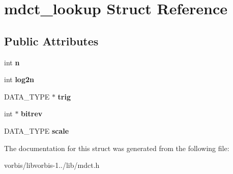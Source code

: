 \hypertarget{structmdct__lookup}{\section{mdct\+\_\+lookup Struct Reference}
\label{structmdct__lookup}
}
\subsection*{Public Attributes}
\begin{DoxyCompactItemize}
\item 
\hypertarget{structmdct__lookup_a593e7827bf9dda70f513223af3169a2d}{int {\bfseries n}}\label{structmdct__lookup_a593e7827bf9dda70f513223af3169a2d}

\item 
\hypertarget{structmdct__lookup_a0caa60b1e24a982eeacdbe31aeca55ab}{int {\bfseries log2n}}\label{structmdct__lookup_a0caa60b1e24a982eeacdbe31aeca55ab}

\item 
\hypertarget{structmdct__lookup_af94ca2b1bc4a58c9088d3abcc375c4f1}{D\+A\+T\+A\+\_\+\+T\+Y\+P\+E $\ast$ {\bfseries trig}}\label{structmdct__lookup_af94ca2b1bc4a58c9088d3abcc375c4f1}

\item 
\hypertarget{structmdct__lookup_ac0d249b62917cc3efe31878122b11404}{int $\ast$ {\bfseries bitrev}}\label{structmdct__lookup_ac0d249b62917cc3efe31878122b11404}

\item 
\hypertarget{structmdct__lookup_a6072369aa974e03908b9a0d73bdb8d2d}{D\+A\+T\+A\+\_\+\+T\+Y\+P\+E {\bfseries scale}}\label{structmdct__lookup_a6072369aa974e03908b9a0d73bdb8d2d}

\end{DoxyCompactItemize}


The documentation for this struct was generated from the following file\+:\begin{DoxyCompactItemize}
\item 
vorbis/libvorbis-\/1../lib/mdct.\+h\end{DoxyCompactItemize}
